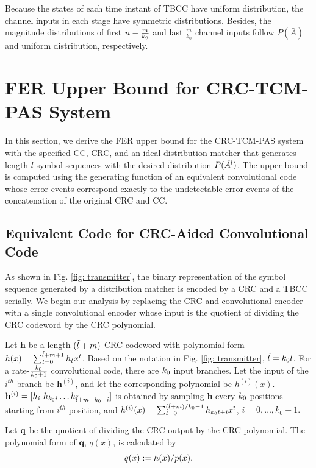 \documentclass [PhD] {uclathes}
\begin{document}
Because the states of each time instant of TBCC have uniform distribution, the channel inputs in each stage have symmetric distributions. Besides, the magnitude distributions of first $n-\frac{m}{k_0}$ and last $\frac{m}{k_0}$ channel inputs follow $P(\bar{A})$ and uniform distribution, respectively.

\section{FER Upper Bound for CRC-TCM-PAS System}\label{sec:tfbound}
In this section, we derive the  FER upper bound for the CRC-TCM-PAS system with the specified CC, CRC, and an ideal distribution matcher that generates length-$l$ symbol sequences with the desired distribution $P(\hat{A}^ l)$. 
The upper bound is computed using the generating function of an equivalent convolutional code whose error events correspond exactly
to the undetectable error events of the concatenation of the original CRC and CC. 

\subsection{Equivalent Code for CRC-Aided Convolutional Code}\label{sec: equ_code}
As shown in Fig. \ref{fig: transmitter}, the binary representation  of the symbol sequence generated by a  distribution matcher is encoded by a CRC and a TBCC serially. We begin our analysis by replacing the CRC and convolutional encoder with a single convolutional encoder whose input is the quotient of dividing the CRC codeword by the CRC polynomial.

Let $\mathbf{h}$ be a length-$(\Tilde{l}+m)$ CRC codeword with polynomial form $h(x)=\sum_{t=0}^{\Tilde{l}+m+1} h_tx^{t}$. Based on the notation in Fig. \ref{fig: transmitter}, $\Tilde{l}=k_0l$. For a rate-$\frac{k_0}{k_0+1}$ convolutional code, there are $k_0$ input branches. Let the input of the $i^{th}$ branch be $\mathbf{h}^{(i)}$, and let the corresponding polynomial be $h^{(i)}(x)$. $\mathbf{h}^{(i)}=[h_i~h_{k_0 i}\ldots h_{\Tilde{l}+m-k_0+i}]$ is obtained by sampling $\mathbf{h}$ every $k_0$ positions starting from $i^{th}$ position, and $h^{(i)}(x)=\sum_{t=0}^{(\Tilde{l}+m)/k_0 -1}{h}_{k_0 t+i}x^{t}$, $i=0,\ldots,k_0-1.$ 

 

Let $\mathbf{q}$ be the quotient of dividing the CRC output by the CRC polynomial. The polynomial form of $\mathbf{q}$, $q(x)$, is calculated by 
\begin{equation}\label{equ: quotient}
  q(x):= h(x)/p(x).
\end{equation}
\end{document}
